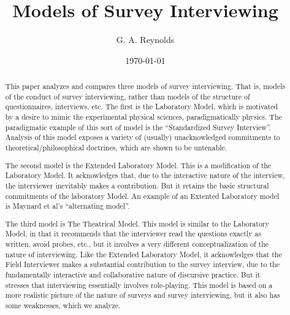 \documentclass[11pt,twoside]{article}
\title{Models of Survey Interviewing}
\author{G. A. Reynolds}
\date{\today}
\begin{document}
\maketitle
\nocite{*}

\begin{abstract}
This paper analyzes and compares three models of survey
interviewing.  That is, models of the conduct of survey interviewing,
rather than models of the structure of questionnaires, interviews,
etc.  The first is the Laboratory Model, which is motivated by a
desire to mimic the experimental physical sciences, paradigmatically
physics.  The paradigmatic example of this sort of model is the
``Standardized Survey Interview''.  Analysis of this model exposes a
variety of (usually) unacknowledged commitments to
theoretical/philosophical doctrines, which are shown to be untenable.

The second model is the Extended Laboratory Model.  This is a
modification of the Laboratory Model.  It acknowledges that, due to
the interactive nature of the interview, the interviewer inevitably
makes a contribution.  But it retains the basic structural commitments
of the laboratory Model.  An example of an Extented Laboratory model
is Maynard et al's ``alternating model''.

The third model is The Theatrical Model.  This model is similar to the
Laboratory Model, in that it recommends that the interviewer read the
questions exactly as written, avoid probes, etc., but it involves a
very different conceptualization of the nature of interviewing.  Like
the Extended Laboratory Model, it acknowledges that the Field
Interviewer makes a substantial contribution to the survey interview,
due to the fundamentally interactive and collaborative nature of
discursive practice.  But it stresses that interviewing essentially
involves role-playing.  This model is based on a more realistic
picture of the nature of surveys and survey interviewing, but it also
has some weaknesses, which we analyze.


\end{abstract}
\end{document}
